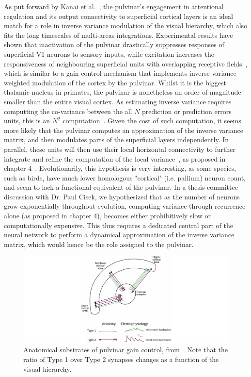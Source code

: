 As put forward by Kanai et al.~\cite{kanai2015cerebral}, the pulvinar’s engagement in attentional regulation and its output connectivity to superficial cortical layers is an ideal match for a role in inverse variance modulation of the visual hierarchy, which also fits the long timescales of multi-areas integrations. Experimental results have shown that inactivation of the pulvinar drastically suppresses responses of superficial \gls{V1} neurons to sensory inputs, while excitation increases the responsiveness of neighbouring superficial units with overlapping receptive fields~\cite{purushothaman2012gating}, which is similar to a gain-control mechanism that implements inverse variance-weighted modulation of the cortex by the pulvinar. Whilst it is the biggest thalamic nucleus in primates, the pulvinar is nonetheless an order of magnitude smaller than the entire visual cortex. As estimating inverse variance requires computting the co-variance between the all $N$ prediction or prediction errors units, this is an $N^2$ computation~\cite{millidge2021predictive}. Given the cost of such computation, it seems more likely that the pulvinar computes an approximation of the inverse variance matrix, and then modulates parts of the superficial layers independently. In parallel, these units will then use their local horizontal connectivity to further integrate and refine the computation of the local variance~\cite{kanai2015cerebral, bastos2012canonical}, as proposed in chapter 4~\cite{ladret2023cortical}. Evolutionarily, this hypothesis is very interesting, as some species, such as birds, have much lower homologous "cortical" (i.e. pallium) neuron count, and seem to lack a functional equivalent of the pulvinar. In a thesis committee discussion with Dr. Paul Cisek, we hypothesized that as the number of neurons grow exponentially throughout evolution, computing variance through recurrence alone (as proposed in chapter 4), becomes either prohibitively slow or computationally expensive. This thus requires a dedicated central part of the neural network to perform a dynamical approximation of the inverse variance matrix, which would hence be the role assigned to the pulvinar.

\begin{figure}[h!tbp]
\vspace{0.1cm}
\centering
\includegraphics[width=1.\textwidth]{fig/chap7_gain_control.pdf}
\caption[Anatomical substrates of pulvinar gain control.]{Anatomical substrates of pulvinar gain control, from~\cite{cortes2021corticothalamic}. Note that the ratio of Type 1 over Type 2 synapses changes as a function of the visual hierarchy.}
\label{fig_chap7_gain_control}
\end{figure}

